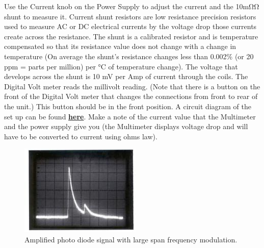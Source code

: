 \documentclass{../lab}
\newcommand{\CircuitForMagneticCoils}{http://experimentationlab.berkeley.edu/sites/default/files/OPT/Circuitformagnetic\%20coils.png}
\begin{document}
Use the Current knob on the Power Supply to adjust the current and the 10mΩΩ shunt to measure it. Current shunt resistors are low resistance precision resistors used to measure AC or DC electrical currents by the voltage drop those currents create across the resistance. The shunt is a calibrated resistor and is temperature compensated so that its resistance value does not change with a change in temperature (On average the shunt's resistance changes less than 0.002\% (or 20 ppm = parts per million) per °C of temperature change). The voltage that develops across the shunt is 10 mV per Amp of current through the coils. The Digital Volt meter reads the millivolt reading. (Note that there is a button on the front of the Digital Volt meter that changes the connections from front to rear of the unit.) This button should be in the front position. A circuit diagram of the set up can be found \href{\CircuitForMagneticCoils}{\textbf{here}}. Make a note of the current value that the Multimeter and the power supply give you (the Multimeter displays voltage drop and will have to be converted to current using ohms law).

\begin{figure}[ht]
    \centering
    \includegraphics[width=0.6\linewidth]{images/PhotodiodeSignal}
    \caption{Amplified photo diode signal with large span frequency modulation.}
    \label{fig:PhotodiodeSignal}
\end{figure}
\end{document}
